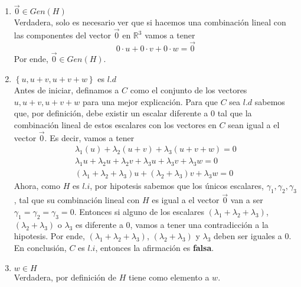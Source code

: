 \documentclass{article}
\begin{document}
\begin{enumerate}
\begin{enumerate}[label=\listAlph]
            \item \(\vec{0} \in Gen\left(H\right)\) \\
                Verdadera, solo es necesario ver que si hacemos una combinación lineal con las componentes del vector \(\vec{0}\) en \(\mathbb{R}^3\) vamos a tener
                \[
                    0 \cdot u + 0 \cdot v + 0 \cdot w = \vec{0}
                \]
                Por ende, \(\vec{0} \in Gen\left(H\right)\).
            \item \(\left\{u, u + v, u + v + w\right\}\) es \(l.d\) \\
                Antes de iniciar, definamos a \(C\) como el conjunto de los vectores \(u, u + v, u + v + w\) para una mejor explicación.
                Para que \(C\) sea \(l.d\) sabemos que, por definición, debe existir un escalar diferente a 0 tal que la combinación lineal de 
                estos escalares con los vectores en \(C\) sean igual a el vector \(\vec{0}\). Es decir, vamos a tener
                \[
                    \begin{gathered}
                        \lambda_1\left(u\right) + \lambda_2\left(u + v\right) + \lambda_3\left(u + v + w\right) = 0 \\
                        \lambda_1u + \lambda_2u + \lambda_2v + \lambda_3u + \lambda_3v + \lambda_3w = 0 \\
                        \left(\lambda_1 + \lambda_2 + \lambda_3\right)u + \left(\lambda_2 + \lambda_3\right)v + \lambda_3w = 0
                    \end{gathered}
                \]
                Ahora, como \(H\) es \(l.i\), por hipotesis sabemos que los únicos escalares, \(\gamma_1, \gamma_2, \gamma_3\), tal que 
                su combinación lineal con \(H\) es igual a el vector \(\vec{0}\) van a ser \(\gamma_1 = \gamma_2 = \gamma_3 = 0\).
                Entonces si alguno de los escalares \(\left(\lambda_1 + \lambda_2 + \lambda_3\right)\), \(\left(\lambda_2 + \lambda_3\right)\) 
                o \(\lambda_3\) es diferente a 0, vamos a tener una contradicción a la hipotesis. Por ende, 
                \(\left(\lambda_1 + \lambda_2 + \lambda_3\right)\), \(\left(\lambda_2 + \lambda_3\right)\) y \(\lambda_3\) deben ser iguales a 0. \\
                En conclusión, \(C\) es \(l.i\), entonces la afirmación es \textbf{falsa}.
            \item \(w \in H\) \\
                Verdadera, por definición de \(H\) tiene como elemento a \(w\).

\end{enumerate}
\end{enumerate}
\end{document}
